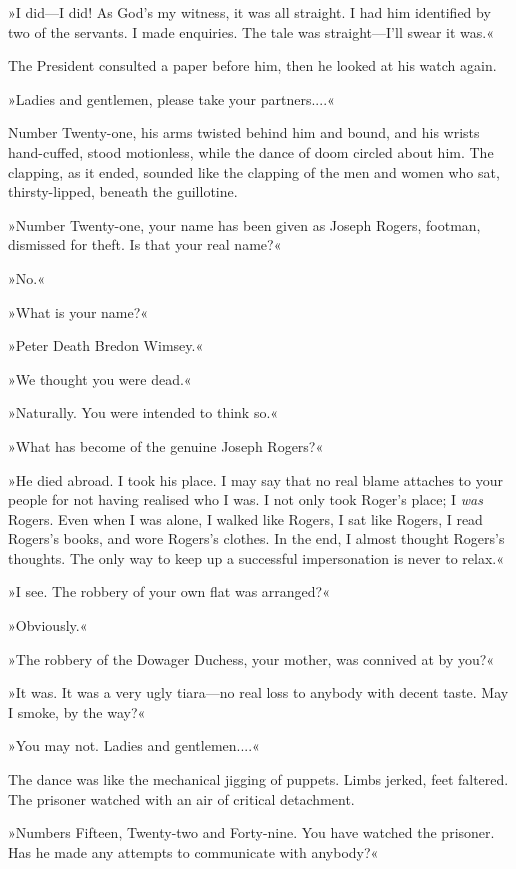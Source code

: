 »I did—I did! As God's my witness, it was all straight. I had him identified by two of the servants. I made enquiries. The tale was straight—I'll swear it was.«

The President consulted a paper before him, then he looked at his watch again.

»Ladies and gentlemen, please take your partners....«

Number Twenty-one, his arms twisted behind him and bound, and his wrists hand-cuffed, stood motionless, while the dance of doom circled about him. The clapping, as it ended, sounded like the clapping of the men and women who sat, thirsty-lipped, beneath the guillotine.

»Number Twenty-one, your name has been given as Joseph Rogers, footman, dismissed for theft. Is that your real name?«

»No.«

»What is your name?«

»Peter Death Bredon Wimsey.«

»We thought you were dead.«

»Naturally. You were intended to think so.«

»What has become of the genuine Joseph Rogers?«

»He died abroad. I took his place. I may say that no real blame attaches to your people for not having realised who I was. I not only took Roger's place; I \textit{was} Rogers. Even when I was alone, I walked like Rogers, I sat like Rogers, I read Rogers's books, and wore Rogers's clothes. In the end, I almost thought Rogers's thoughts. The only way to keep up a successful impersonation is never to relax.«

»I see. The robbery of your own flat was arranged?«

»Obviously.«

»The robbery of the Dowager Duchess, your mother, was connived at by you?«

»It was. It was a very ugly tiara—no real loss to anybody with decent taste. May I smoke, by the way?«

»You may not. Ladies and gentlemen....«

The dance was like the mechanical jigging of puppets. Limbs jerked, feet faltered. The prisoner watched with an air of critical detachment.

»Numbers Fifteen, Twenty-two and Forty-nine. You have watched the prisoner. Has he made any attempts to communicate with anybody?«

